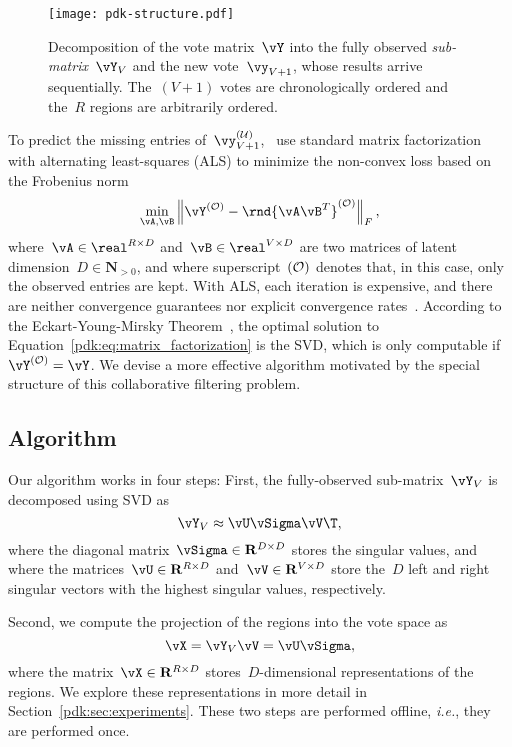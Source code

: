 \begin{figure}
	\texttt{[image: pdk-structure.pdf]}
	\caption{
		Decomposition of the vote matrix~$\vY$ into the fully observed \emph{sub-matrix}~$\vY_V$ and the new vote~$\vy_{V+1}$, whose results arrive sequentially.
		The~$(V+1)$ votes are chronologically ordered and the~$R$ regions are arbitrarily ordered.
	}
	\label{pdk:fig:structure}
\end{figure}

To predict the missing entries of~$\vy^{(\Ubs)}_{V+1}$,~\citet{etter2016online} use standard matrix factorization with alternating least-squares (ALS) to minimize the non-convex loss based on the Frobenius norm
\begin{equation}
	\label{pdk:eq:matrix_factorization}
	\min_{\vA, \vB} \left\Vert \vY^{(\Obs)} - \rnd{\vA\vB^T}^{(\Obs)} \right\Vert_F,
\end{equation}
where~$\vA \in \real^{R \times D}$ and~$\vB \in \real^{V \times D}$ are two matrices of latent dimension~$D \in \mathbf{N}_{>0}$, and where superscript~$(\mathcal{O})$ denotes that, in this case, only the observed entries are kept.
With ALS, each iteration is expensive, and there are neither convergence guarantees nor explicit convergence rates~\cite{bell2007scalable, koren2009matrix}.
According to the Eckart-Young-Mirsky Theorem~\citep{eckart1936approximation}, the optimal solution to Equation~\eqref{pdk:eq:matrix_factorization} is the SVD, which is only computable if~$\vY^{(\Obs)}=\vY$.
We devise a more effective algorithm motivated by the special structure of this collaborative filtering problem\cite{etter2016online}.

\subsection{Algorithm}

Our algorithm works in four steps:
First, the fully-observed sub-matrix~$\vY_V$ is decomposed using SVD as
\begin{equation}
	\label{pdk:eq:svd}
	\vY_V \approx \vU \vSigma \vV\T,
\end{equation}
where the diagonal matrix~$\vSigma \in \mathbf{R}^{D \times D}$ stores the singular values, and where the matrices~$\vU \in \mathbf{R}^{R \times D}$ and~$\vV \in \mathbf{R}^{V \times D}$ store the~$D$ left and right singular vectors with the highest singular values, respectively.

Second, we compute the projection of the regions into the vote space as
\begin{equation}
	\label{pdk:eq:projection}
	\vX = \vY_V \vV = \vU \vSigma,
\end{equation}
where the matrix~$\vX \in \mathbf{R}^{R \times D}$ stores~$D$-dimensional representations of the regions.
We explore these representations in more detail in Section~\ref{pdk:sec:experiments}.
These two steps are performed offline, \textit{i.e.}, they are performed once.

